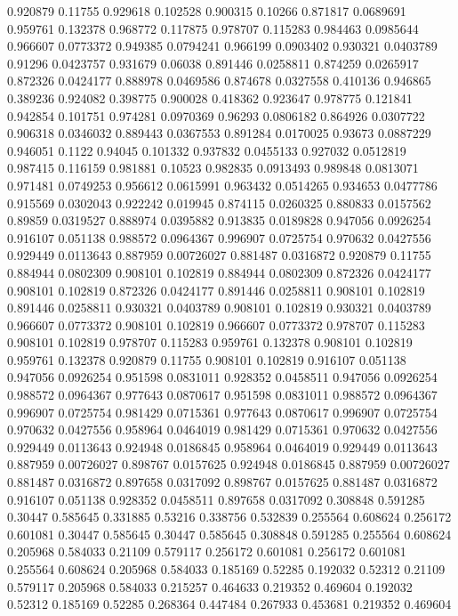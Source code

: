 0.920879 0.11755
0.929618 0.102528
0.900315 0.10266
0.871817 0.0689691
0.959761 0.132378
0.968772 0.117875
0.978707 0.115283
0.984463 0.0985644
0.966607 0.0773372
0.949385 0.0794241
0.966199 0.0903402
0.930321 0.0403789
0.91296 0.0423757
0.931679 0.06038
0.891446 0.0258811
0.874259 0.0265917
0.872326 0.0424177
0.888978 0.0469586
0.874678 0.0327558
0.410136 0.946865
0.389236 0.924082
0.398775 0.900028
0.418362 0.923647
0.978775 0.121841
0.942854 0.101751
0.974281 0.0970369
0.96293 0.0806182
0.864926 0.0307722
0.906318 0.0346032
0.889443 0.0367553
0.891284 0.0170025
0.93673 0.0887229
0.946051 0.1122
0.94045 0.101332
0.937832 0.0455133
0.927032 0.0512819
0.987415 0.116159
0.981881 0.10523
0.982835 0.0913493
0.989848 0.0813071
0.971481 0.0749253
0.956612 0.0615991
0.963432 0.0514265
0.934653 0.0477786
0.915569 0.0302043
0.922242 0.019945
0.874115 0.0260325
0.880833 0.0157562
0.89859 0.0319527
0.888974 0.0395882
0.913835 0.0189828
0.947056 0.0926254
0.916107 0.051138
0.988572 0.0964367
0.996907 0.0725754
0.970632 0.0427556
0.929449 0.0113643
0.887959 0.00726027
0.881487 0.0316872
0.920879 0.11755
0.884944 0.0802309
0.908101 0.102819
0.884944 0.0802309
0.872326 0.0424177
0.908101 0.102819
0.872326 0.0424177
0.891446 0.0258811
0.908101 0.102819
0.891446 0.0258811
0.930321 0.0403789
0.908101 0.102819
0.930321 0.0403789
0.966607 0.0773372
0.908101 0.102819
0.966607 0.0773372
0.978707 0.115283
0.908101 0.102819
0.978707 0.115283
0.959761 0.132378
0.908101 0.102819
0.959761 0.132378
0.920879 0.11755
0.908101 0.102819
0.916107 0.051138
0.947056 0.0926254
0.951598 0.0831011
0.928352 0.0458511
0.947056 0.0926254
0.988572 0.0964367
0.977643 0.0870617
0.951598 0.0831011
0.988572 0.0964367
0.996907 0.0725754
0.981429 0.0715361
0.977643 0.0870617
0.996907 0.0725754
0.970632 0.0427556
0.958964 0.0464019
0.981429 0.0715361
0.970632 0.0427556
0.929449 0.0113643
0.924948 0.0186845
0.958964 0.0464019
0.929449 0.0113643
0.887959 0.00726027
0.898767 0.0157625
0.924948 0.0186845
0.887959 0.00726027
0.881487 0.0316872
0.897658 0.0317092
0.898767 0.0157625
0.881487 0.0316872
0.916107 0.051138
0.928352 0.0458511
0.897658 0.0317092
0.308848 0.591285
0.30447 0.585645
0.331885 0.53216
0.338756 0.532839
0.255564 0.608624
0.256172 0.601081
0.30447 0.585645
0.30447 0.585645
0.308848 0.591285
0.255564 0.608624
0.205968 0.584033
0.21109 0.579117
0.256172 0.601081
0.256172 0.601081
0.255564 0.608624
0.205968 0.584033
0.185169 0.52285
0.192032 0.52312
0.21109 0.579117
0.205968 0.584033
0.215257 0.464633
0.219352 0.469604
0.192032 0.52312
0.185169 0.52285
0.268364 0.447484
0.267933 0.453681
0.219352 0.469604
